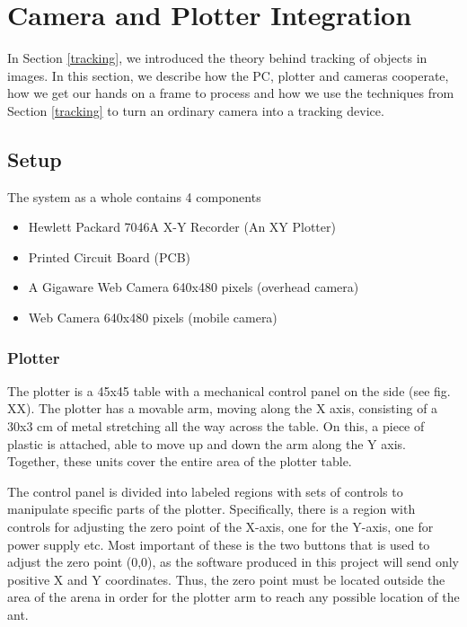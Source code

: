 
\section{Camera and Plotter Integration}

In Section \ref{tracking}, we introduced the theory behind tracking of objects in images. In this section, we describe how the PC, plotter and cameras cooperate, how we get our hands on a frame to process and how we use the techniques from Section \ref{tracking} to turn an ordinary camera into a tracking device.

\subsection{Setup}

The system as a whole contains 4 components

\begin{itemize}
  \item Hewlett Packard 7046A X-Y Recorder (An XY Plotter)
  \item Printed Circuit Board (PCB)
  \item A Gigaware Web Camera 640x480 pixels (overhead camera)
  \item Web Camera 640x480 pixels (mobile camera)
\end{itemize}

\subsubsection{Plotter}
The plotter is a 45x45 table with a mechanical control panel on the side (see fig. XX). The plotter has a movable arm, moving along the X axis, consisting of a 30x3 cm of metal stretching all the way across the table. On this, a piece of plastic is attached, able to move up and down the arm along the Y axis. Together, these units cover the entire area of the plotter table.

The control panel is divided into labeled regions with sets of controls to manipulate specific parts of the plotter. Specifically, there is a region with controls for adjusting the zero point of the X-axis, one for the Y-axis, one for power supply etc. Most important of these is the two buttons that is used to adjust the zero point (0,0), as the software produced in this project will send only positive X and Y coordinates. Thus, the zero point must be located outside the area of the arena in order for the plotter arm to reach any possible location of the ant.


